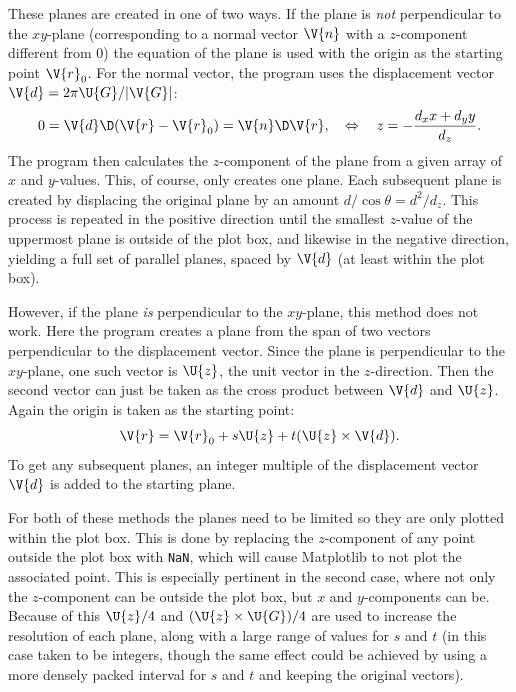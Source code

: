 \documentclass[main.tex]{subfiles}
\begin{document}
	These planes are created in one of two ways. If the plane is \textit{not} perpendicular to the $ xy $-plane (corresponding to a normal vector $ \V{n} $ with a $ z $-component different from 0) the equation of the plane is used with the origin as the starting point $ \V{r}_0 $. For the normal vector, the program uses the displacement vector $ \V{d} = 2\pi \U{G} / |\V{G}| $:
	\begin{equation}
		0 = \V{d} \D (\V{r}-\V{r}_0) = \V{n} \D \V{r}, \quad \Leftrightarrow \quad z = -\frac{d_x x + d_y y}{d_z}.
	\end{equation}
	The program then calculates the $ z $-component of the plane from a given array of $ x $ and $ y $-values. This, of course, only creates one plane. Each subsequent plane is created by displacing the original plane by an amount $ d/\cos \theta = d^2/d_z$. This process is repeated in the positive direction until the smallest $ z $-value of the uppermost plane is outside of the plot box, and likewise in the negative direction, yielding a full set of parallel planes, spaced by $ \V{d} $ (at least within the plot box).
	
	However, if the plane \textit{is} perpendicular to the $ xy $-plane, this method does not work. Here the program creates a plane from the span of two vectors perpendicular to the displacement vector. Since the plane is perpendicular to the $ xy $-plane, one such vector is $ \U{z} $, the unit vector in the $ z $-direction. Then the second vector can just be taken as the cross product between $ \V{d} $ and $ \U{z} $. Again the origin is taken as the starting point:
	\begin{equation}
		\V{r} = \V{r}_0 + s \U{z} + t (\U{z} \times \V{d}).
	\end{equation}
	To get any subsequent planes, an integer multiple of the displacement vector $ \V{d} $ is added to the starting plane.
	
	For both of these methods the planes need to be limited so they are only plotted within the plot box. This is done by replacing the $ z $-component of any point outside the plot box with \texttt{NaN}, which will cause Matplotlib to not plot the associated point. This is especially pertinent in the second case, where not only the $ z $-component can be outside the plot box, but $ x $ and $ y $-components can be. Because of this $ \U{z}/4 $ and $ (\U{z} \times \U{G})/4 $ are used to increase the resolution of each plane, along with a large range of values for $ s $ and $ t $ (in this case taken to be integers, though the same effect could be achieved by using a more densely packed interval for $ s $ and $ t $ and keeping the original vectors).
	
\end{document}

